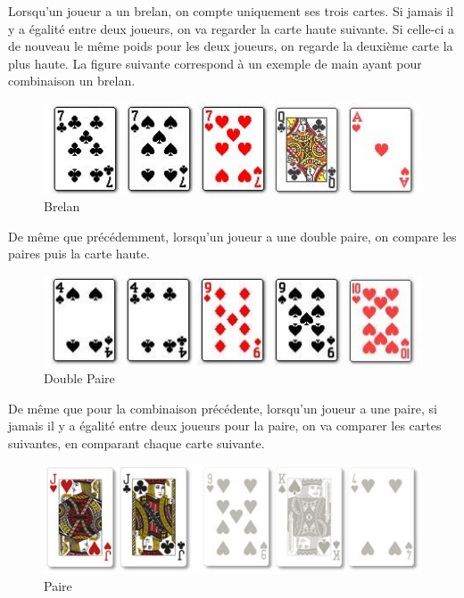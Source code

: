\documentclass{report}
\begin{document}
Lorsqu'un joueur a un brelan, on compte uniquement ses trois cartes. Si jamais il y a égalité entre deux joueurs, on va regarder la carte haute suivante. Si celle-ci a de nouveau le même poids pour les deux joueurs, on regarde la deuxième carte la plus haute. La figure suivante correspond à un exemple de main ayant pour combinaison un brelan.\par
		\begin{figure}[h]
			\begin{center}
				\includegraphics[scale=0.4]{./imagesRapport/brelan.jpg}
			\end{center}
			\caption[Brelan]{Brelan}
		\end{figure}
		\medskip
De même que précédemment, lorsqu'un joueur a une double paire, on compare les paires puis la carte haute. 
		\begin{figure}[h]
			\begin{center}
				\includegraphics[scale=0.3]{./imagesRapport/doublePaire.jpg}
			\end{center}
			\caption[Double Paire]{Double Paire}
		\end{figure}
		\medskip

De même que pour la combinaison précédente, lorsqu'un joueur a une paire, si jamais il y a égalité entre deux joueurs pour la paire, on va comparer les cartes suivantes, en comparant chaque carte suivante. \par
\newpage
		\begin{figure}[h]
			\begin{center}
				\includegraphics[scale=0.3]{./imagesRapport/paire.jpg}
			\end{center}
			\caption[Paire]{Paire}
		\end{figure}
		\medskip
\end{document}
